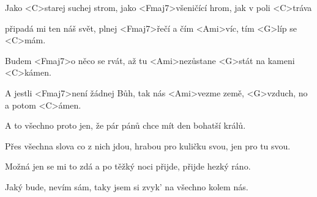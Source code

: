 

\zs
Jako <C>starej suchej strom, jako <Fmaj7>všeničící hrom, jak v poli <C>tráva

připadá mi ten náš svět, plnej <Fmaj7>řečí a čím <Ami>víc, tím <G>líp se <C>mám.
\ks

\zr
Budem <Fmaj7>o něco se rvát, až tu <Ami>nezůstane <G>stát na kameni <C>kámen.

A jestli <Fmaj7>není žádnej Bůh, tak nás <Ami>vezme země, <G>vzduch, no a potom <C>ámen.
\kr


\zs
A to všechno proto jen, že pár pánů chce mít den bohatší králů.

Přes všechna slova co z nich jdou, hrabou pro kuličku svou, jen pro tu svou.
\ks


\zs
Možná jen se mi to zdá a po těžký noci přijde, přijde hezký ráno.

Jaký bude, nevím sám, taky jsem si zvyk' na všechno kolem nás.
\ks

\kp
